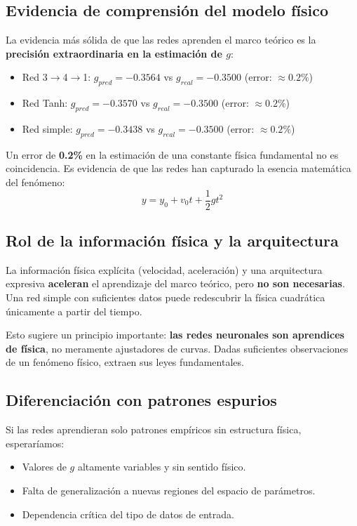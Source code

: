 \documentclass[11pt]{article}
\begin{document}
\subsection{Evidencia de comprensión del modelo físico}
La evidencia más sólida de que las redes aprenden el marco teórico es la \textbf{precisión extraordinaria en la estimación de $g$}:
\begin{itemize}
    \item Red 3$\rightarrow$4$\rightarrow$1: $g_{pred} = -0.3564$ vs $g_{real} = -0.3500$ (error: $\approx 0.2\%$)
    \item Red Tanh: $g_{pred} = -0.3570$ vs $g_{real} = -0.3500$ (error: $\approx 0.2\%$)
    \item Red simple: $g_{pred} = -0.3438$ vs $g_{real} = -0.3500$ (error: $\approx 0.2\%$)
\end{itemize}

Un error de \textbf{0.2\%} en la estimación de una constante física fundamental no es coincidencia. Es evidencia de que las redes han capturado la esencia matemática del fenómeno: 
$$y = y_0 + v_0 t + \frac{1}{2} g t^2$$

\subsection{Rol de la información física y la arquitectura}
La información física explícita (velocidad, aceleración) y una arquitectura expresiva \textbf{aceleran} el aprendizaje del marco teórico, pero \textbf{no son necesarias}. Una red simple con suficientes datos puede redescubrir la física cuadrática únicamente a partir del tiempo.

Esto sugiere un principio importante: \textbf{las redes neuronales son aprendices de física}, no meramente ajustadores de curvas. Dadas suficientes observaciones de un fenómeno físico, extraen sus leyes fundamentales.

\subsection{Diferenciación con patrones espurios}
Si las redes aprendieran solo patrones empíricos sin estructura física, esperaríamos:
\begin{itemize}
    \item Valores de $g$ altamente variables y sin sentido físico.
    \item Falta de generalización a nuevas regiones del espacio de parámetros.
    \item Dependencia crítica del tipo de datos de entrada.
\end{itemize}
\end{document}

